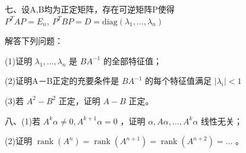 \documentclass[11pt,fontset=fandol]{ctexart}
\begin{document}
七、设A,B均为正定矩阵，存在可逆矩阵P使得
\(P ^ { T } A P = E _ { n } , \ P ^ { T } B P = D = \mathrm { d i a g } ( \lambda _ { 1 } , \ldots , \lambda _ { n } )\)

解答下列问题：

(1)证明 \(\lambda _ { 1 } , \ldots , \lambda _ { n }\) 是
\(B A ^ { - 1 }\) 的全部特征值；

(2)证明A－B正定的充要条件是 \(B A ^ { - 1 }\) 的每个特征值满足
\(| \lambda _ { i } | < 1\)

(3)若 \(A ^ { 2 } - B ^ { 2 }\) 正定，证明 \(A - B\) 正定。

八、(1)若 \(A ^ { k } \alpha \neq 0 , A ^ { k + 1 } \alpha = 0\) ，证明
\(\alpha , A \alpha , \ldots , A ^ { k } \alpha\) 线性无关；

(2)证明
\(\operatorname{rank} ( A ^ { n } ) = \operatorname{rank} ( A ^ { n + 1 } ) = \operatorname{rank} ( A ^ { n + 2 } ) = . . .\)
。
\end{document}
